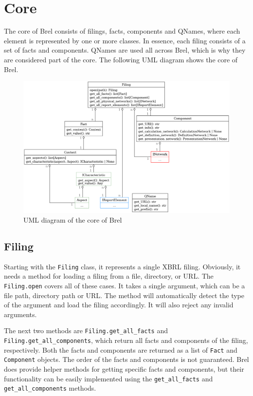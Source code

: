 \section{Core}

The core of Brel consists of filings, facts, components and QNames, where each element is represented by one or more classes.
In essence, each filing consists of a set of facts and components. 
QNames are used all across Brel, which is why they are considered part of the core.
The following UML diagram shows the core of Brel.

\begin{figure}[H]
    \centering
    \includegraphics[width=\textwidth]{images/brel_core_classes.png}
    \caption{UML diagram of the core of Brel}
    \label{fig:brel_core_classes}
\end{figure}

\subsection{Filing}
\label{subsec:filing}

Starting with the \texttt{Filing} class, it represents a single XBRL filing.
Obviously, it needs a method for loading a filing from a file, directory, or URL.
The \texttt{Filing.open} covers all of these cases. 
It takes a single argument, which can be a file path, directory path or URL.
The method will automatically detect the type of the argument and load the filing accordingly.
It will also reject any invalid arguments.

The next two methods are \texttt{Filing.get\_all\_facts} and \texttt{Filing.get\_all\_components},
which return all facts and components of the filing, respectively.
Both the facts and components are returned as a list of \texttt{Fact} and \texttt{Component} objects.
The order of the facts and components is not guaranteed.
Brel does provide helper methods for getting specific facts and components,
but their functionality can be easily implemented using the \texttt{get\_all\_facts} and \texttt{get\_all\_components} methods.

